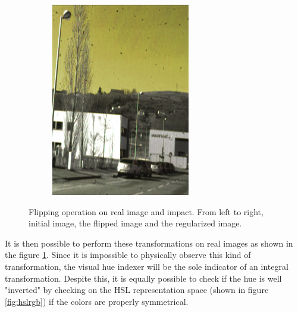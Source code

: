 \begin{figure}[h]
\begin{subfigure}[b]{0.32\linewidth}
		\includegraphics[width=\linewidth]{Figures/Aug/regularized_flipped.png}
	\end{subfigure}
	
	\caption[Flipping operation on real image and impact.]{Flipping operation on real image and impact. From left to right, initial image, the flipped image and the regularized image.}\label{flipread}
\end{figure}

It is then possible to perform these transformations on real images as shown in the figure \ref{flipread}.
Since it is impossible to physically observe this kind of transformation, the visual hue indexer will be the sole indicator of an integral transformation. Despite this, it is equally possible to check if the hue is well "inverted" by checking on the HSL representation space (shown in figure \ref{fig:hslrgb}) if the colors are properly symmetrical.

